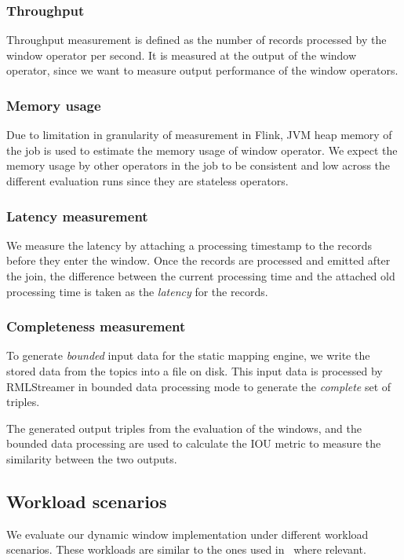 \subsubsection{Throughput}%
\label{ssub:Throughput}
Throughput measurement is defined as the number of records processed by the 
window operator per second. 
It is measured at the output of the window operator, since we want to measure 
output performance of the window operators. 


\subsubsection{Memory usage}%
\label{ssub:Memory usage}
Due to limitation in granularity of measurement in Flink, 
JVM heap memory of the job is used to estimate the memory usage of window 
operator. We expect the memory usage by other operators in the job to be 
consistent and low across the different evaluation runs since they are stateless operators.

\subsubsection{Latency measurement}%
\label{ssub:Latency measurement}
We measure the latency by attaching a processing timestamp to the 
records before they enter the window. 
Once the records are processed and emitted after the join, the difference 
between the current processing time and the attached old processing time 
is taken as the \emph{latency} for the records. 

\subsubsection{Completeness measurement}%
\label{ssub:Completeness measurement}
To generate \emph{bounded} input data for 
the static mapping engine, we write the stored data from the topics 
into a file on disk. This input data is processed by RMLStreamer in bounded data 
processing mode to generate the \emph{complete} set of triples. 

The generated output triples from the evaluation of the windows, and the bounded data processing are 
used to calculate the IOU metric to measure the similarity between the two outputs.    



\subsection{Workload scenarios}
\label{sec:workload}
We evaluate our dynamic window implementation under different workload scenarios. 
These workloads are similar to the ones used in~\cite{evalution_of_spe} where relevant.

